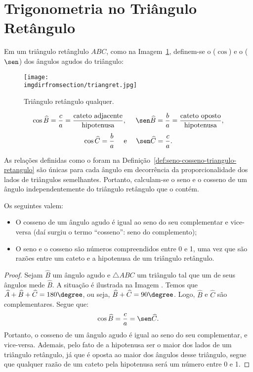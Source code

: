 \section{Trigonometria no Triângulo Retângulo}

\begin{definition}
\label{def:seno-cosseno-triangulo-retangulo}
Em um triângulo retânglulo $ABC$, como na Imagem~\ref{fig:triangulo-retangulo}, definem-se o
 ($\cos$) e o  ($\sen$) dos ângulos agudos do
triângulo:
%
\begin{figure}[H]
\centering
\texttt{[image: \\imgdirfromsection/triangret.jpg]}
\caption{Triângulo retângulo qualquer.}
\label{fig:triangulo-retangulo}
\end{figure}
%
$$\cos \widehat B = \frac c a = \frac {\text{cateto
adjacente}}{\text{hipotenusa}}, \ \ \ \ \sen \widehat B = \frac b a = \frac
{\text{cateto oposto}}{\text{hipotenusa}},$$
$$\cos \widehat C = \frac b a \ \ \ \ \text{e} \ \ \ \ \sen \widehat
C = \frac c a.$$    
\end{definition}

\begin{remark}
As relações definidas como o foram na Definição~\ref{def:seno-cosseno-triangulo-retangulo} são únicas para cada ângulo em
decorrência da proporcionalidade dos lados de triângulos
semelhantes. Portanto, calculam-se o seno e o cosseno de um ângulo
independentemente do triângulo retângulo que o contém.
\end{remark}

\begin{proposition}
Os seguintes valem:
\begin{itemize}
    \item O cosseno de um ângulo agudo é igual ao seno do seu
    complementar e vice-versa (daí surgiu o termo ``cosseno'': seno do complemento);
    \item O seno e o cosseno são números compreendidos entre 0 e 1, uma vez que são razões entre um cateto 
    e a hipotenusa de um triângulo retângulo.
\end{itemize}
\end{proposition}

\begin{proof}
    Sejam $\widehat B$ um ângulo agudo e $\triangle ABC$ um triângulo tal que um de seus ângulos mede $\widehat B$.
    A situação é ilustrada na Imagem . %
    Temos que $\widehat A + \widehat B  + \widehat C = 180\degree$, ou seja, $\widehat B  + \widehat C = 90\degree$.
    Logo, $\widehat B$ e $\widehat C$ são complementares. Segue que:
    $$\cos \widehat B = \frac c a = \sen \widehat C.$$ Portanto, o cosseno de um ângulo agudo é igual ao seno do seu complementar,
    e vice-versa. Ademais, pelo fato de a hipotenusa ser o maior dos lados de um triângulo retângulo, já que é oposta ao 
    maior dos ângulos desse triângulo, segue que qualquer razão de um cateto pela hipotenusa será um número entre 0 e 1.
\end{proof}

